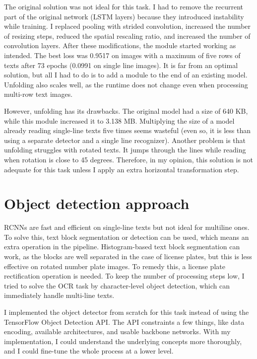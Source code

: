 The original solution was not ideal for this task. I had to remove the recurrent part of the original network (LSTM layers) because they introduced instability while training. I replaced pooling with strided convolution, increased the number of resizing steps, reduced the spatial rescaling ratio, and increased the number of convolution layers. After these modifications, the module started working as intended. The best loss was 0.9517 on images with a maximum of five rows of texts after 73 epochs (0.0991 on single line images). It is far from an optimal solution, but all I had to do is to add a module to the end of an existing model. Unfolding also scales well, as the runtime does not change even when processing multi-row text images.

However, unfolding has its drawbacks. The original model had a size of 640 KB, while this module increased it to 3.138 MB. Multiplying the size of a model already reading single-line texts five times seems wasteful (even so, it is less than using a separate detector and a single line recognizer). Another problem is that unfolding struggles with rotated texts. It jumps through the lines while reading when rotation is close to 45 degrees. Therefore, in my opinion, this solution is not adequate for this task unless I apply an extra horizontal transformation step.

\section{Object detection approach}

RCNNs are fast and efficient on single-line texts but not ideal for multiline ones. To solve this, text block segmentation or detection can be used, which means an extra operation in the pipeline. Histogram-based text block segmentation can work, as the blocks are well separated in the case of license plates, but this is less effective on rotated number plate images. To remedy this, a license plate rectification operation is needed. To keep the number of processing steps low, I tried to solve the OCR task by character-level object detection, which can immediately handle multi-line texts.

I implemented the object detector from scratch for this task instead of using the TensorFlow Object Detection API. The API constraints a few things, like data encoding, available architectures, and usable backbone networks. With my implementation, I could understand the underlying concepts more thoroughly, and I could fine-tune the whole process at a lower level. 

